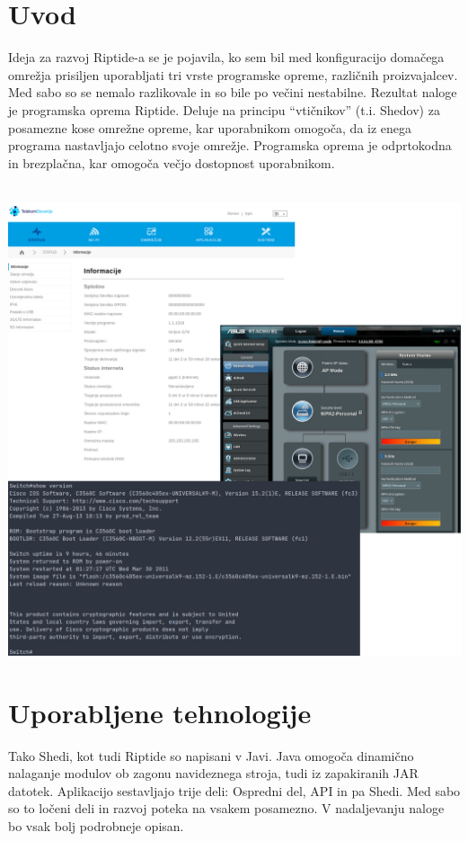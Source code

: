 \documentclass[12pt]{article}
\begin{document}
\tableofcontents
\newpage

\section{Uvod}
Ideja za razvoj Riptide-a se je pojavila, ko sem bil med konfiguracijo
domačega omrežja prisiljen uporabljati tri vrste programske opreme,
različnih proizvajalcev. Med sabo so se nemalo razlikovale in so bile
po večini nestabilne. Rezultat naloge je programska oprema Riptide.
Deluje na principu “vtičnikov” (t.i. Shedov) za posamezne kose omrežne
opreme, kar uporabnikom omogoča, da iz enega programa nastavljajo celotno
svoje omrežje. Programska oprema je odprtokodna in brezplačna, kar omogoča
večjo dostopnost uporabnikom.
\\\\

\begin{center}
	\includegraphics[scale=0.24]{slike/config.png}
\end{center}
\newpage

\section{Uporabljene tehnologije}
Tako Shedi, kot tudi Riptide so napisani v Javi. Java omogoča dinamično
nalaganje modulov ob zagonu navideznega stroja, tudi iz zapakiranih JAR
datotek. Aplikacijo sestavljajo trije deli: Ospredni del, API in pa Shedi. Med
sabo so to ločeni deli in razvoj poteka na vsakem posamezno. V nadaljevanju
naloge bo vsak bolj podrobneje opisan.
\end{document}
